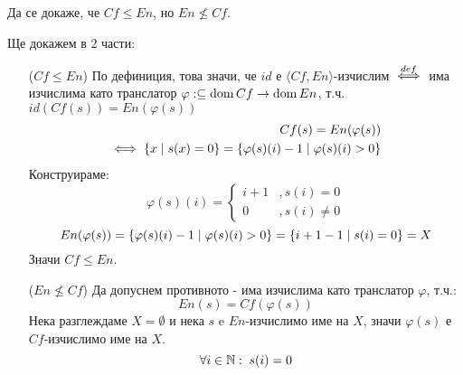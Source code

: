 \begin{problem}
Да се докаже, че $Cf \leq En$, но $En \not\leq Cf$.
\end{problem}
\begin{solution}
    Ще докажем в 2 части:
    \begin{itemize}
        \item[($Cf \leq En$)] По дефиниция, това значи, че $id$ е $\langle Cf, En\rangle$-изчислим ${\overset{def}{\iff}}$ има изчислима като транслатор $\varphi: \subseteq \operatorname*{dom} Cf\to\operatorname*{dom} En$, т.ч. $id(Cf(s)) = En(\varphi(s))$
              \begin{equation}
                  \begin{split}
                      Cf(s) = En(\varphi(s)) \\
                      \iff \left\{x \mid s(x) = 0\right\} = \left\{\varphi(s)(i) - 1 \mid \varphi(s)(i) > 0\right\}
                  \end{split}
              \end{equation}
              Конструираме:
              \begin{equation}
                  \varphi(s)(i) = \begin{cases}
                      i + 1 & , s(i) = 0    \\
                      0     & , s(i) \neq 0
                  \end{cases}
              \end{equation}
              \begin{equation}
                  En(\varphi(s)) = \left\{\varphi(s)(i) - 1 \mid \varphi(s)(i) > 0\right\} = \left\{i + 1 - 1 \mid s(i) = 0\right\} = X
              \end{equation}
              Значи $Cf \leq En$.
        \item[($En \not\leq Cf$)] Да допуснем противното - има изчислима като транслатор $\varphi$, т.ч.:
              \begin{equation}
                  En(s) = Cf(\varphi(s))
              \end{equation}
              Нека разглеждаме $X = \emptyset$ и нека $s$ e $En$-изчислимо име на $X$, значи $\varphi(s)$ е $Cf$-изчислимо име на $X$.
              \begin{equation}
                  \forall i\in {\mathbb{N}}:\; s(i) = 0
              \end{equation}


\end{itemize}
\end{solution}
